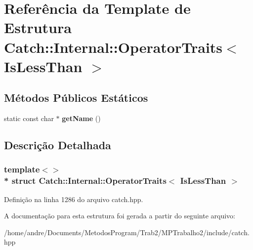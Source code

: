 \hypertarget{structCatch_1_1Internal_1_1OperatorTraits_3_01IsLessThan_01_4}{}\section{Referência da Template de Estrutura Catch\+:\+:Internal\+:\+:Operator\+Traits$<$ Is\+Less\+Than $>$}
\label{structCatch_1_1Internal_1_1OperatorTraits_3_01IsLessThan_01_4}
\subsection*{Métodos Públicos Estáticos}
\begin{DoxyCompactItemize}
\item 
static const char $\ast$ {\bfseries get\+Name} ()\hypertarget{structCatch_1_1Internal_1_1OperatorTraits_3_01IsLessThan_01_4_aa3b536ddbd2e34b1253931ff00c32712}{}\label{structCatch_1_1Internal_1_1OperatorTraits_3_01IsLessThan_01_4_aa3b536ddbd2e34b1253931ff00c32712}

\end{DoxyCompactItemize}


\subsection{Descrição Detalhada}
\subsubsection*{template$<$$>$\\*
struct Catch\+::\+Internal\+::\+Operator\+Traits$<$ Is\+Less\+Than $>$}



Definição na linha 1286 do arquivo catch.\+hpp.



A documentação para esta estrutura foi gerada a partir do seguinte arquivo\+:\begin{DoxyCompactItemize}
\item 
/home/andre/\+Documents/\+Metodos\+Program/\+Trab2/\+M\+P\+Trabalho2/include/catch.\+hpp\end{DoxyCompactItemize}
